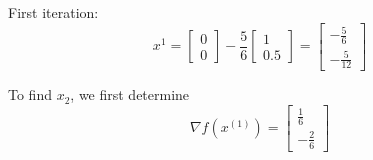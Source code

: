 \documentclass[12pt]{article}
\begin{document}
First iteration:\\
$$x^1 = \begin{bmatrix}0 \\ 0 \end{bmatrix} - \frac{5}{6} \begin{bmatrix} 
  1 \\ 0.5
\end{bmatrix} = \begin{bmatrix}
  -\frac{5}{6} \\ -\frac{5}{12}
\end{bmatrix}$$

To find \( x_2 \), we first determine
\[
\nabla f(x^{(1)}) = \begin{bmatrix}
  \frac{1}{6} \\ -\frac{2}{6}
\end{bmatrix}
\]
\end{document}
